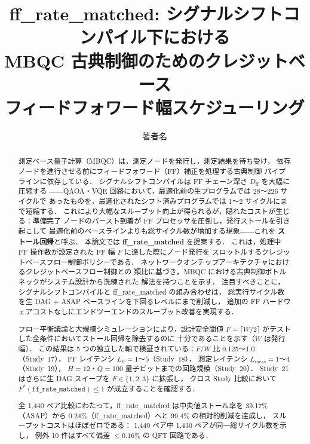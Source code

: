 \documentclass[journal,10pt,twocolumn]{IEEEtran}
\begin{document}
\title{ff\_rate\_matched: シグナルシフトコンパイル下における\\
MBQC 古典制御のためのクレジットベース\\
フィードフォワード幅スケジューリング}

\author{著者名}

\maketitle

\begin{abstract}
測定ベース量子計算（MBQC）は，測定ノードを発行し，測定結果を待ち受け，
依存ノードを進行させる前にフィードフォワード（FF）補正を処理する古典制御
パイプラインに依存している．
シグナルシフトコンパイルは FF チェーン深さ $D_{\mathrm{ff}}$ を大幅に圧縮する
――QAOA・VQE 回路において，最適化前の生プログラムでは 28〜226 サイクルで
あったものを，最適化されたシフト済みプログラムでは 1〜2 サイクルにまで短縮する．
これにより大幅なスループット向上が得られるが，隠れたコストが生じる：準備完了
ノードのバースト到着が FF プロセッサを圧倒し，発行ストールを引き起こして
最適化前のベースラインよりも総サイクル数が増加する現象――これを
\textbf{ストール回帰}と呼ぶ．
本論文では \textbf{ff\_rate\_matched} を提案する．
これは，処理中 FF 操作数が設定された FF 幅 $F$ に達した際にノード発行を
スロットルするクレジットベースフロー制御ポリシーである．
ネットワークオンチップアーキテクチャにおけるクレジットベースフロー制御との
類比に基づき，MBQC における古典制御ボトルネックがシステム設計から洗練された
解法を持つことを示す．
注目すべきことに，シグナルシフトコンパイルと ff\_rate\_matched の組み合わせは，
総実行サイクル数を生 DAG + ASAP ベースラインを下回るレベルにまで削減し，
追加の FF ハードウェアコストなしにエンドツーエンドのスループット改善を実現する．

フロー平衡議論と大規模シミュレーションにより，設計安全閾値
$F = \lceil W/2 \rceil$ がテストした全条件においてストール回帰を除去するのに
十分であることを示す（$W$ は発行幅）．
この結果は 5 つの独立した軸で検証されている：$F/W$ 比 0.125〜1.0（Study~17），
FF レイテンシ $L_{\mathrm{ff}} = 1$〜$5$（Study~18），
測定レイテンシ $L_{\mathrm{meas}} = 1$〜$4$（Study~19），
$H=12$・$Q=100$ 量子ビットまでの回路規模（Study~20）．
Study~21 はさらに生 DAG スイープを $F \in \{1, 2, 3\}$ に拡張し，
クロス Study 比較において $F^*(\texttt{ff\_rate\_matched}) \leq 1$ が成立することを確認する．

全 1,440 ペア比較にわたって，ff\_rate\_matched は中央値ストール率を
39.17\%（ASAP）から 0.24\%（ff\_rate\_matched）へと 99.4\% の相対的削減を達成し，
スループットコストはほぼゼロである：
1,440 ペア中 1,430 ペアが同一総サイクル数を示し，
例外 10 件はすべて偏差 $\leq 0.16\%$ の QFT 回路である．
\end{abstract}
\end{document}
